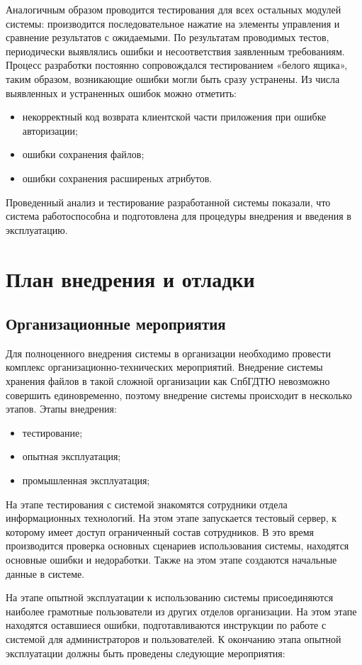 \documentclass[utf8,usehyperref,12pt]{G7-32}
\begin{document}
Аналогичным образом проводится тестирования для всех остальных модулей системы: производится последовательное нажатие на элементы управления и сравнение результатов с  ожидаемыми. По результатам проводимых тестов, периодически выявлялись ошибки и несоответствия заявленным требованиям. Процесс разработки постоянно сопровождался тестированием «белого ящика», таким образом, возникающие ошибки могли быть сразу устранены. Из числа выявленных и устраненных ошибок можно отметить:
\begin{itemize}
 \item некорректный код возврата клиентской части приложения при ошибке авторизации;
 \item ошибки сохранения файлов;
 \item ошибки сохранения расширеных атрибутов. 
\end{itemize}

Проведенный анализ и тестирование разработанной системы показали, что система работоспособна и подготовлена для процедуры внедрения и введения в  эксплуатацию.

\section{План внедрения и отладки}
\subsection{Организационные мероприятия}
Для полноценного внедрения системы в организации необходимо провести комплекс организационно-технических мероприятий. Внедрение системы хранения файлов в такой сложной организации как СпбГДТЮ невозможно совершить единовременно, поэтому внедрение системы происходит в несколько этапов. Этапы внедрения:
\begin{itemize}
 \item тестирование;
 \item опытная эксплуатация;
 \item промышленная эксплуатация;
\end{itemize}

На этапе тестирования с системой знакомятся сотрудники отдела информационных технологий. На этом этапе запускается тестовый сервер, к которому имеет доступ ограниченный состав сотрудников. В это время производится проверка основных сценариев использования системы, находятся основные ошибки и недоработки. Также на этом этапе создаются начальные данные в системе.

На этапе опытной эксплуатации к использованию системы присоединяются наиболее грамотные пользователи из других отделов организации. На этом этапе находятся оставшиеся ошибки, подготавливаются инструкции по работе с системой для администраторов и пользователей. К окончанию этапа опытной эксплуатации должны быть проведены следующие мероприятия:
\end{document}
